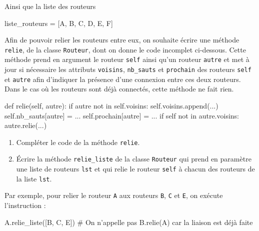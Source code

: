 Ainsi que la liste des routeurs

\begin{CodePythontexAlt}[TaillePolice=\large, Largeur=1\linewidth,Centre,Lignes=true,PremLigne=1]{}
liste_routeurs = [A, B, C, D, E, F]
    \end{CodePythontexAlt}

    Afin de pouvoir relier les routeurs entre eux, on souhaite écrire une méthode \verb|relie|, de la classe \verb|Routeur|, dont on donne le code incomplet ci-dessous. Cette méthode prend en argument le routeur \verb|self| ainsi qu’un routeur \verb|autre| et met à jour si nécessaire les attributs \verb|voisins|, \verb|nb_sauts| et \verb|prochain| des routeurs \verb|self| et \verb|autre| afin d’indiquer la présence d’une connexion entre ces deux routeurs. Dans le cas où les routeurs sont déjà connectés, cette méthode ne fait rien.

    \begin{CodePythontexAlt}[TaillePolice=\large, Largeur=1\linewidth,Centre,Lignes=true,PremLigne=1]{}
def relie(self, autre): 
    if autre not in self.voisins: 
        self.voisins.append(...) 
        self.nb_sauts[autre] = ... 
        self.prochain[autre] = ... 
        if self not in autre.voisins: 
            autre.relie(...)
    \end{CodePythontexAlt}

    \begin{enumerate}[series=monDS, resume]
        \item Compléter le code de la méthode \verb|relie|.

\medskip

        \item Écrire la méthode \verb|relie_liste| de la classe \verb|Routeur| qui prend en paramètre une liste de routeurs \verb|lst| et qui relie le routeur \verb|self| à chacun des routeurs de la liste \verb|lst|.
        

    \end{enumerate}

    Par exemple, pour relier le routeur \verb|A| aux routeurs \verb|B|, \verb|C| et \verb|E|, on exécute l’instruction :

    \begin{CodePythontexAlt}[TaillePolice=\large, Largeur=1\linewidth,Centre,Lignes=true,PremLigne=1]{}

A.relie_liste([B, C, E]) 
# On n'appelle pas B.relie(A) car la liaison est déjà faite
    \end{CodePythontexAlt}

